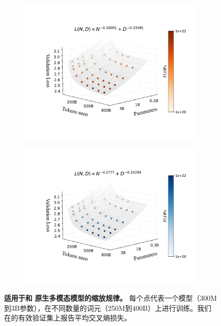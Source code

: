 
\begin{figure}[t!]
    \centering
    \captionsetup{type=figure}
    \begin{subfigure}[t]{0.48\linewidth}
        \centering
        \includegraphics[width=1.02\linewidth]{assets/early/3d_scaling_early.pdf}
    \end{subfigure}
    \hfil
    \begin{subfigure}[t]{0.48\linewidth}
        \centering
        \includegraphics[width=1.02\linewidth]{assets/early/3d_scaling_late.pdf}
    \end{subfigure}
    \vspace{5pt}
    \setlength{\fboxsep}{0.5pt}
    \setlength{\fboxrule}{0pt}
    \caption{\textbf{适用于和
    原生多模态模型的缩放规律。} 每个点代表一个模型（300M到3B参数），在不同数量的词元（250M到400B）上进行训练。我们在的有效验证集上报告平均交叉熵损失。}
    \label{fig:early_vs_late_scaleflops_3d}
\end{figure}
